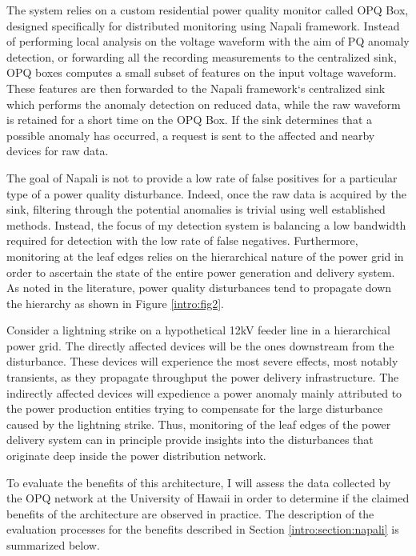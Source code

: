 The system relies on a custom residential power quality monitor called OPQ Box, designed specifically for distributed monitoring using Napali framework. Instead of performing local analysis on the voltage waveform with the aim of PQ anomaly detection, or forwarding all the recording measurements to the centralized sink, OPQ boxes computes a small subset of features on the input voltage waveform. These features are then forwarded to the Napali framework`s centralized sink which performs the anomaly detection on reduced data, while the raw waveform is retained for a short time on the OPQ Box. If the sink determines that a possible anomaly has occurred, a request is sent to the affected and nearby devices for raw data.

The goal of Napali is not to provide a low rate of false positives for a particular type of a power quality disturbance. Indeed, once the raw data is acquired by the sink, filtering through the potential anomalies is trivial using well established methods. Instead, the focus of my detection system is balancing a low bandwidth required for detection with the low rate of false negatives. Furthermore, monitoring at the leaf edges relies on the hierarchical nature of the power grid in order to ascertain the state of the entire power generation and delivery system. As noted in the literature, power quality disturbances tend to propagate down the hierarchy as shown in Figure \ref{intro:fig2}. 

Consider a lightning strike on a hypothetical 12kV feeder line in a hierarchical power grid. The directly affected devices will be the ones downstream from the disturbance. These devices will experience the most severe effects, most notably transients, as they propagate throughput the power delivery infrastructure. The indirectly affected devices will expedience a power anomaly mainly attributed to the power production entities trying to compensate for the large disturbance caused by the lightning strike. Thus, monitoring of the leaf edges of the power delivery system can in principle provide insights into the disturbances that originate deep inside the power distribution network.

To evaluate the benefits of this architecture, I will assess the data collected by the OPQ network at the University of Hawaii in order to determine if the claimed benefits of the architecture are observed in practice. The description of the evaluation processes for the benefits described in Section \ref{intro:section:napali} is summarized below.

